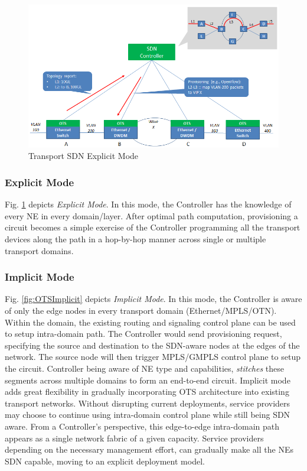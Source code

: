 \documentclass{sig-alternate-10pt}
\begin{document}
	\begin{figure}[htb]
	\centering
	\includegraphics[scale=0.37]{OTSExplicit.png}
	\caption{Transport SDN Explicit Mode}
	\label{fig:OTSExplicit}
	\end{figure}

	\subsubsection{Explicit Mode}
	Fig. \ref{fig:OTSExplicit} depicts \textit{Explicit Mode}. In this mode, the Controller has the knowledge
	of every NE in every domain/layer. After optimal path computation, provisioning a circuit becomes a
	simple exercise of the Controller programming all the transport devices along the path in a hop-by-hop
	manner across single or multiple transport domains.
	
	\subsubsection{Implicit Mode} Fig. \ref{fig:OTSImplicit} depicts \textit{Implicit Mode}. In this mode,
	the Controller is aware of only the edge nodes in every transport domain (Ethernet/MPLS/OTN). Within the
	domain, the existing routing and signaling control plane can be used to setup intra-domain path. The
	Controller would send provisioning request, specifying the source and destination to the SDN-aware nodes
	at the edges of the network. The source node will then trigger MPLS/GMPLS control plane to setup the circuit.
	Controller being aware of NE type and capabilities, \textit{stitches} these segments across multiple
	domains to form an end-to-end circuit. Implicit mode adds great flexibility in gradually incorporating
	OTS architecture into existing transport networks. Without disrupting current deployments, service
	providers may choose to continue using intra-domain control plane while still being SDN aware. From a
	Controller's perspective, this edge-to-edge intra-domain path appears as a single network fabric of a
	given capacity. Service providers depending on the necessary management effort, can gradually make
	all the NEs SDN capable, moving to an explicit deployment model.
\end{document}
